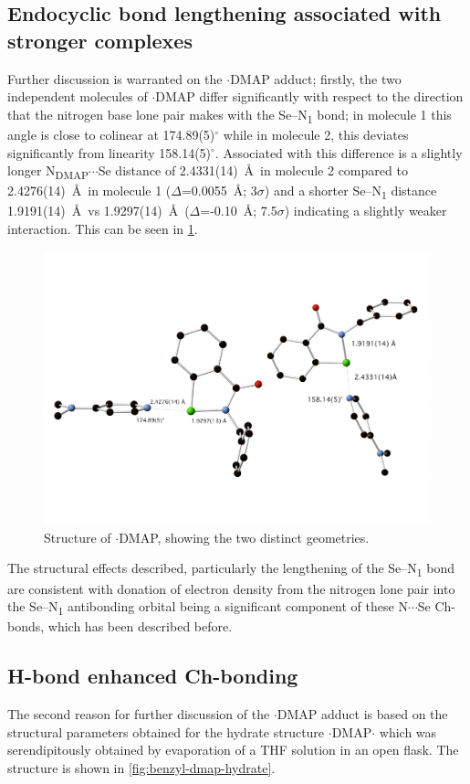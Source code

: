 \subsection{Endocyclic bond lengthening associated with stronger complexes}
Further discussion is warranted on the $\cdot$DMAP adduct; firstly, the two independent molecules of $\cdot$DMAP differ significantly with respect to the direction that the nitrogen base lone pair makes with the Se--N\textsubscript{1} bond; in molecule 1 this angle is close to colinear at 174.89(5)$^\circ$ while in molecule 2, this deviates significantly from linearity 158.14(5)$^\circ$.
Associated with this difference is a slightly longer N\textsubscript{DMAP}$\cdots$Se distance of 2.4331(14)~\AA\ in molecule 2 compared to 2.4276(14)~\AA\ in molecule 1 ($\Delta$=0.0055~\AA ; 3$\sigma$) and a shorter Se--N\textsubscript{1} distance 1.9191(14)~\AA\ vs 1.9297(14)~\AA\ ($\Delta$=-0.10~\AA ; 7.5$\sigma$) indicating a slightly weaker interaction.
This can be seen in \ref{fig:benzyl-dmap-xray-2}.

\begin{figure}
  \centering
  \includegraphics[width=0.8\linewidth]{fig/benzyl-dmap-xray-2.pdf}
  \caption{Structure of $\cdot$DMAP, showing the two distinct geometries.}
  \label{fig:benzyl-dmap-xray-2}
\end{figure}

The structural effects described, particularly the lengthening of the Se--N\textsubscript{1} bond are consistent with donation of electron density from the nitrogen lone pair into the Se--N\textsubscript{1} antibonding orbital being a significant component of these N$\cdots$Se Ch-bonds, which has been described before\autocite{Pascoe2017}.

\subsection{H-bond enhanced Ch-bonding}
The second reason for further discussion of the $\cdot$DMAP adduct is based on the structural parameters obtained for the hydrate structure $\cdot$DMAP$\cdot$ which was serendipitously obtained by evaporation of a THF solution in an open flask.
The structure is shown in \ref{fig:benzyl-dmap-hydrate}.

